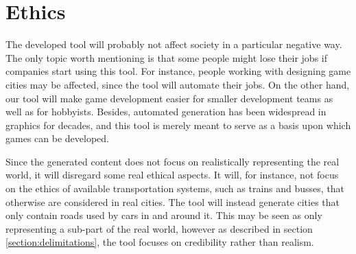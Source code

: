 \section{Ethics}

The developed tool will probably not affect society in a particular negative way. The only topic worth mentioning is that some people might lose their jobs if companies start using this tool. For instance, people working with designing game cities may be affected, since the tool will automate their jobs. On the other hand, our tool will make game development easier for smaller development teams as well as for hobbyists. Besides, automated generation has been widespread in graphics for decades, and this tool is merely meant to serve as a basis upon which games can be developed.

Since the generated content does not focus on realistically representing the real world, it will disregard some real ethical aspects. It will, for instance, not focus on the ethics of available transportation systems, such as trains and busses, that otherwise are considered in real cities. The tool will instead generate cities that only contain roads used by cars in and around it. This may be seen as only representing a sub-part of the real world, however as described in section \ref{section:delimitations}, the tool focuses on credibility rather than realism.